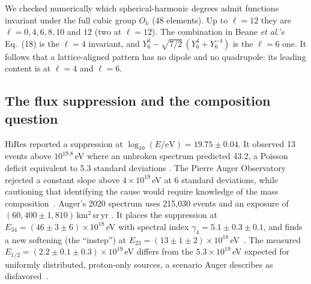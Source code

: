 We checked numerically which spherical-harmonic degrees admit functions
invariant under the full cubic group $O_h$ (48 elements). Up to $\ell=12$ they
are $\ell=0,4,6,8,10$ and $12$ (two at $\ell=12$). The combination in Beane
\emph{et al.}'s Eq.~(18) is the $\ell=4$ invariant, and
$Y_6^0-\sqrt{7/2}\,(Y_6^4+Y_6^{-4})$ is the $\ell=6$ one. It follows that a
lattice-aligned pattern has no dipole and no quadrupole: its leading content
is at $\ell=4$ and $\ell=6$.

\subsection{The flux suppression and the composition question}
\label{sec:uhecr:spectrum}

HiRes reported a suppression at $\log_{10}(E/\mathrm{eV})=19.75\pm0.04$. It
observed 13 events above $10^{19.8}$\,eV where an unbroken spectrum predicted
43.2, a Poisson deficit equivalent to 5.3 standard deviations
\cite{HiRes2008first}. The Pierre Auger Observatory rejected a constant slope
above $4\times10^{19}$\,eV at 6 standard deviations, while cautioning that
identifying the cause would require knowledge of the mass
composition~\cite{PierreAuger2008observation}. Auger's 2020 spectrum uses
215{,}030 events and an exposure of $(60{,}400\pm1{,}810)$\,km$^2$\,sr\,yr
\cite{PierreAuger2020measurement}. It places the suppression at
$E_{34}=(46\pm3\pm6)\times10^{18}$\,eV with spectral index
$\gamma_4=5.1\pm0.3\pm0.1$, and finds a new softening (the ``instep'') at
$E_{23}=(13\pm1\pm2)\times10^{18}$\,eV~\cite{PierreAuger2020features}. The
measured $E_{1/2}=(2.2\pm0.1\pm0.3)\times10^{19}$\,eV differs from the
$5.3\times10^{19}$\,eV expected for uniformly distributed, proton-only sources,
a scenario Auger describes as disfavored~\cite{PierreAuger2020features}.

